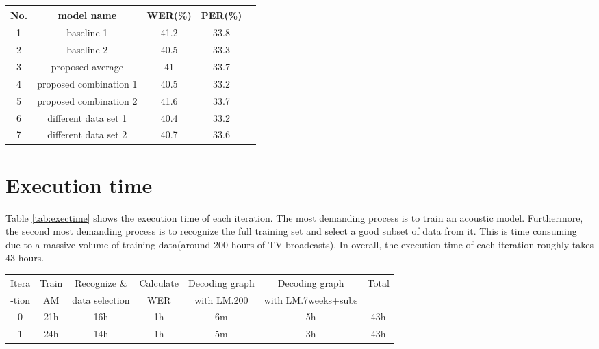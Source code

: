 

\begin{center}
\label{tab:proposedModel}
\begin{tabular}{ | c | c | c | c | c |   }
\hline
No.  & model name & WER(\%) & PER(\%) \\ \hline
1  & baseline 1 & 41.2 & 33.8  \\ \hline
2  & baseline 2 & 40.5 & 33.3  \\ \hline
3 & proposed average & 41 & 33.7 \\ \hline
4 & proposed combination 1 & 40.5 & 33.2 \\ \hline
5 & proposed combination 2 &  41.6 & 33.7  \\ \hline
6 & different data set 1 & 40.4 & 33.2 \\ \hline
7 & different data set 2 & 40.7 & 33.6 \\ \hline
\end{tabular}
\end{center}

\section{Execution time}

Table \ref{tab:exectime} shows the execution time of each iteration. The most demanding process is to train an acoustic model. Furthermore, the second most demanding process is to recognize the full training set and select  a good subset of data from it. This is time consuming due to a massive volume of training data(around 200 hours of TV broadcasts). In overall, the execution time of each iteration roughly takes 43 hours. 

\begin{center}
\label{tab:exectime}
\begin{tabular}{ | c | c | c | c | c | c | c |   }
\hline
Itera & Train & Recognize \&  & Calculate & Decoding graph  & Decoding graph  & Total \\ 
-tion & AM &  data selection & WER & with LM.200 &  with LM.7weeks+subs & \\ \hline
0 & 21h & 16h & 1h & 6m & 5h & 43h  \\ \hline
1 & 24h & 14h & 1h & 5m & 3h & 43h  \\ \hline
\end{tabular}
\end{center}

